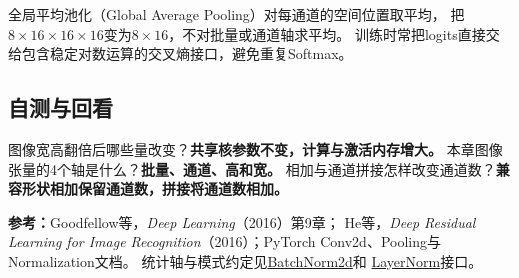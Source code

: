 全局平均池化（Global Average Pooling）对每通道的空间位置取平均，
把$8\times16\times16\times16$变为$8\times16$，不对批量或通道轴求平均。
训练时常把logits直接交给包含稳定对数运算的交叉熵接口，避免重复Softmax。

\subsection{自测与回看}
图像宽高翻倍后哪些量改变？\textbf{共享核参数不变，计算与激活内存增大。}
本章图像张量的4个轴是什么？\textbf{批量、通道、高和宽。}
相加与通道拼接怎样改变通道数？\textbf{兼容形状相加保留通道数，拼接将通道数相加。}

\begingroup\small
\noindent\textbf{参考：}Goodfellow等，\textit{Deep Learning}（2016）第9章；
He等，\textit{Deep Residual Learning for Image Recognition}（2016）；PyTorch Conv2d、Pooling与Normalization文档。
统计轴与模式约定见\href{https://docs.pytorch.org/docs/stable/generated/torch.nn.BatchNorm2d.html}{BatchNorm2d}和
\href{https://docs.pytorch.org/docs/stable/generated/torch.nn.LayerNorm.html}{LayerNorm}接口。
\par\endgroup
